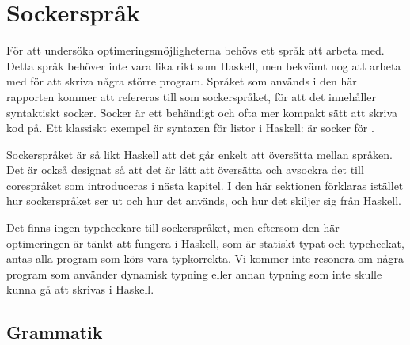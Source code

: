 \documentclass[Rapport]{subfiles}
\begin{document}
\section{Sockerspråk}
\label{sec:Socker}

%
%
%
%
%
%
%

%




\overviewSugar

För att undersöka optimeringsmöjligheterna behövs ett språk att arbeta med. 
Detta språk behöver inte vara lika rikt som Haskell, men bekvämt nog
att arbeta med för att skriva några större program. Språket som används i den
här rapporten kommer att refereras till som sockerspråket, för att det 
innehåller syntaktiskt socker. Socker är ett behändigt och ofta mer kompakt sätt 
att skriva kod på. Ett klassiskt exempel är syntaxen
för listor i Haskell: \miniCode{[5,0,4]} är socker för .

Sockerspråket är så likt Haskell att det går enkelt att översätta mellan språken.
Det är också designat så att det är lätt att översätta och avsockra det till 
corespråket som introduceras i nästa kapitel. I den här sektionen
förklaras istället hur sockerspråket ser ut och hur det används, och hur
det skiljer sig från Haskell.

Det finns ingen typcheckare till sockerspråket, men eftersom den här optimeringen
är tänkt att fungera i Haskell, som är statiskt typat och typcheckat, antas
alla program som körs vara typkorrekta. Vi kommer inte resonera om några program
som använder dynamisk typning eller annan typning som inte skulle kunna gå
att skrivas i Haskell.

\subsection{Grammatik}
\end{document}
